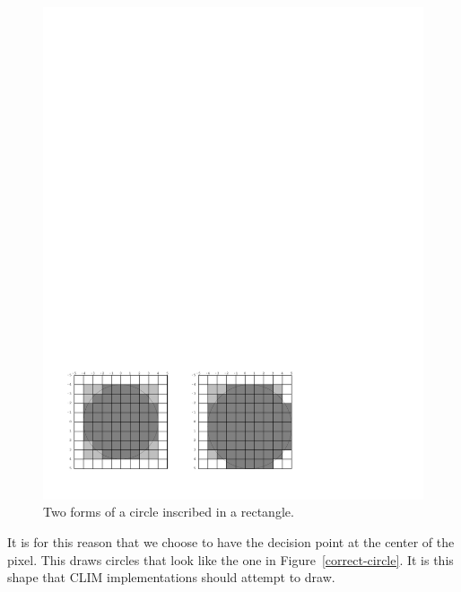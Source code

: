 \begin{figure}
\centerline{\includegraphics{inscribed-circle}}
\caption{\label{inscribed-circle} Two forms of a circle inscribed in a rectangle.}
\end{figure}

It is for this reason that we choose to have the decision point at the center of
the pixel.  This draws circles that look like the one in
Figure~\ref{correct-circle}.  It is this shape that CLIM implementations should
attempt to draw.

